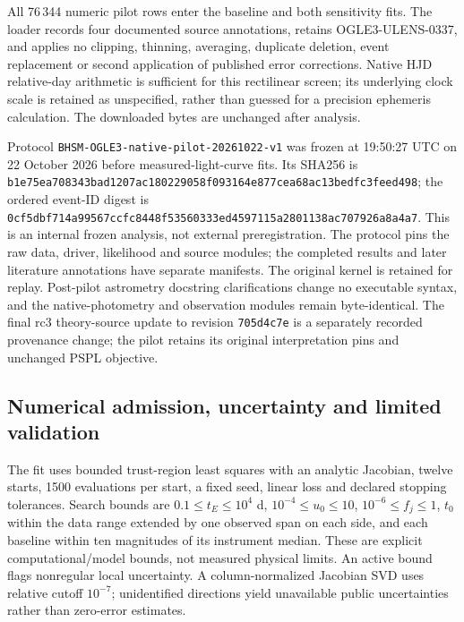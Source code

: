 All 76\,344 numeric pilot rows enter the baseline and both sensitivity
fits. The loader records four documented source annotations, retains
OGLE3-ULENS-0337, and applies no clipping, thinning, averaging, duplicate
deletion, event replacement or second application of published error
corrections. Native HJD relative-day arithmetic is sufficient for this
rectilinear screen; its underlying clock scale is retained as unspecified,
rather than guessed for a precision ephemeris calculation. The downloaded
bytes are unchanged after analysis.

Protocol \texttt{BHSM-OGLE3-native-pilot-20261022-v1} was frozen at
19:50:27 UTC on 22 October 2026 before measured-light-curve fits. Its
SHA256 is
\texttt{b1e75ea7\allowbreak{}08343bad\allowbreak{}1207ac18\allowbreak{}0229058f\allowbreak{}093164e8\allowbreak{}77cea68a\allowbreak{}c13bedfc\allowbreak{}3feed498};
the ordered event-ID digest is
\texttt{0cf5dbf7\allowbreak{}14a99567\allowbreak{}ccfc8448\allowbreak{}f5356033\allowbreak{}3ed45971\allowbreak{}15a28011\allowbreak{}38ac7079\allowbreak{}26a8a4a7}.
This is an internal frozen analysis, not external preregistration.
The protocol pins the raw data, driver, likelihood and source modules;
the completed results and later literature annotations have separate
manifests. The original kernel is retained for replay. Post-pilot
astrometry docstring clarifications change no executable syntax, and
the native-photometry and observation modules remain byte-identical.
The final rc3 theory-source update to revision \texttt{705d4c7e} is a
separately recorded provenance change; the pilot retains its original
interpretation pins and unchanged PSPL objective.

\subsection{Numerical admission, uncertainty and limited validation}

The fit uses bounded trust-region least squares with an analytic
Jacobian, twelve starts, 1500 evaluations per start, a fixed seed,
linear loss and declared stopping tolerances. Search bounds are
$0.1\leq t_E\leq10^4$ d, $10^{-4}\leq u_0\leq10$,
$10^{-6}\leq f_j\leq1$, $t_0$ within the data range extended by one
observed span on each side, and each baseline within ten magnitudes of
its instrument median. These are explicit computational/model bounds,
not measured physical limits. An active bound flags nonregular local
uncertainty. A column-normalized Jacobian SVD uses relative cutoff
$10^{-7}$; unidentified directions yield unavailable public
uncertainties rather than zero-error estimates.

